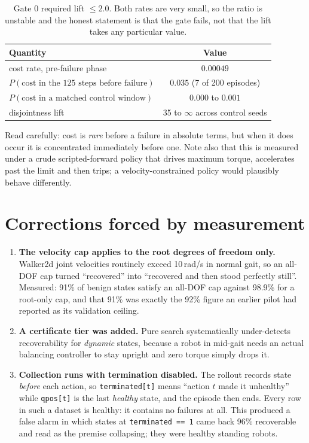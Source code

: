 \documentclass[11pt,a4paper]{article}
\begin{document}
\begin{table}[H]
\centering
\begin{tabular}{lc}
\toprule
Quantity & Value \\
\midrule
cost rate, pre-failure phase & $0.00049$ \\
$P(\text{cost in the 125 steps before failure})$ & $0.035$ \quad (7 of 200 episodes) \\
$P(\text{cost in a matched control window})$ & $0.000$ to $0.001$ \\
disjointness lift & 35 to $\infty$ across control seeds \\
\bottomrule
\end{tabular}
\caption{Gate 0 required lift $\leq 2.0$. Both rates are very small, so the ratio is unstable and
the honest statement is that the gate fails, not that the lift takes any particular value.}
\end{table}

Read carefully: cost is \emph{rare} before a failure in absolute terms, but when it does occur it
is concentrated immediately before one. Note also that this is measured under a crude
scripted-forward policy that drives maximum torque, accelerates past the limit and then trips; a
velocity-constrained policy would plausibly behave differently.

\section{Corrections forced by measurement}

\begin{enumerate}
  \item \textbf{The velocity cap applies to the root degrees of freedom only.} Walker2d joint
    velocities routinely exceed 10\,rad/s in normal gait, so an all-DOF cap turned ``recovered''
    into ``recovered and then stood perfectly still''. Measured: 91\% of benign states satisfy an
    all-DOF cap against 98.9\% for a root-only cap, and that 91\% was exactly the 92\% figure an
    earlier pilot had reported as its validation ceiling.
  \item \textbf{A certificate tier was added.} Pure search systematically under-detects
    recoverability for \emph{dynamic} states, because a robot in mid-gait needs an actual
    balancing controller to stay upright and zero torque simply drops it.
  \item \textbf{Collection runs with termination disabled.} The rollout records state
    \emph{before} each action, so \texttt{terminated[t]} means ``action $t$ made it unhealthy''
    while \texttt{qpos[t]} is the last \emph{healthy} state, and the episode then ends. Every row
    in such a dataset is healthy: it contains no failures at all. This produced a false alarm in
    which states at \texttt{terminated == 1} came back 96\% recoverable and read as the premise
    collapsing; they were healthy standing robots.
\end{enumerate}
\end{document}
